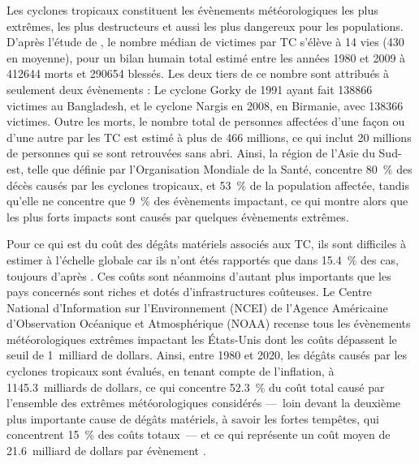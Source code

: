 \documentclass[../main.tex]{subfiles}
\begin{document}
Les cyclones tropicaux constituent les évènements météorologiques les plus extrêmes, les plus destructeurs et aussi les plus dangereux pour les populations. D'après l'étude de \cite{doocy_human_2013}, le nombre médian de victimes par TC s'élève à \num{14} vies (\num{430} en moyenne), pour un bilan humain total estimé entre les années 1980 et 2009 à \num{412644} morts et \num{290654} blessés. Les deux tiers de ce nombre sont attribués à seulement deux évènements : Le cyclone Gorky de 1991 ayant fait \num{138866} victimes au Bangladesh, et le cyclone Nargis en 2008, en
Birmanie, avec \num{138366} victimes. Outre les morts, le nombre total de personnes affectées d'une façon ou d'une autre par les TC est estimé à plus de \num{466} millions, ce qui inclut \num{20} millions de personnes qui se sont retrouvées sans abri. Ainsi, la région de l'Asie du Sud-est, telle que définie par l'Organisation Mondiale de la Santé, concentre \SI{80}{\percent} des décès causés par les cyclones tropicaux, et \SI{53}{\percent} de la population affectée, tandis qu'elle ne
concentre que \SI{9}{\percent} des évènements impactant, ce qui montre alors que les plus forts impacts sont causés par quelques évènements extrêmes.

Pour ce qui est du coût des dégâts matériels associés aux TC, ils sont difficiles à estimer à l'échelle globale car ils n'ont étés rapportés que dans \SI{15.4}{\percent} des cas, toujours d'après \cite{doocy_human_2013}. Ces coûts sont néanmoins d'autant plus importants que les pays concernés sont riches et dotés d'infrastructures coûteuses. Le Centre National d'Information sur l'Environnement (NCEI) de l'Agence Américaine d'Observation Océanique et Atmosphérique (NOAA) recense tous les
évènements météorologiques extrêmes impactant les États-Unis dont les coûts dépassent le seuil de \num{1}~milliard de dollars. Ainsi, entre 1980 et 2020, les dégâts causés par les cyclones tropicaux sont évalués, en tenant compte de l'inflation, à \num{1145.3}~milliards de dollars, ce qui concentre \SI{52.3}{\percent} du coût total causé par l'ensemble des extrêmes météorologiques considérés ---~loin devant la deuxième plus importante cause de dégâts matériels, à savoir les fortes tempêtes, qui
concentrent \SI{15}{\percent} des coûts totaux~--- et ce qui représente un coût moyen de \num{21.6}~milliard de dollars par évènement
\parencite{smith_billiondollar_2020}.
\end{document}
